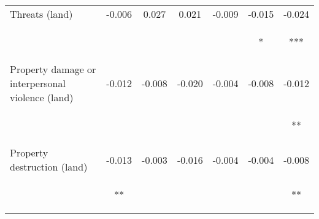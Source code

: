 \begin{tabular}{lcccccc}
\noalign{\smallskip}Threats (land) & -0.006 & 0.027 & 0.021 & -0.009 & -0.015 & -0.024\\
 & \begin{footnotesize}[0.011]\end{footnotesize} & \begin{footnotesize}[0.018]\end{footnotesize} & \begin{footnotesize}[0.017]\end{footnotesize} & \begin{footnotesize}[0.006]\end{footnotesize} & \begin{footnotesize}[0.008]*\end{footnotesize} & \begin{footnotesize}[0.008]***\end{footnotesize}\\
\noalign{\smallskip}Property damage or interpersonal violence (land) & -0.012 & -0.008 & -0.020 & -0.004 & -0.008 & -0.012\\
 & \begin{footnotesize}[0.009]\end{footnotesize} & \begin{footnotesize}[0.013]\end{footnotesize} & \begin{footnotesize}[0.012]\end{footnotesize} & \begin{footnotesize}[0.004]\end{footnotesize} & \begin{footnotesize}[0.006]\end{footnotesize} & \begin{footnotesize}[0.005]**\end{footnotesize}\\
\noalign{\smallskip}Property destruction (land) & -0.013 & -0.003 & -0.016 & -0.004 & -0.004 & -0.008\\
 & \begin{footnotesize}[0.006]**\end{footnotesize} & \begin{footnotesize}[0.011]\end{footnotesize} & \begin{footnotesize}[0.010]\end{footnotesize} & \begin{footnotesize}[0.003]\end{footnotesize} & \begin{footnotesize}[0.004]\end{footnotesize} & \begin{footnotesize}[0.004]**\end{footnotesize}\\

\end{tabular}

